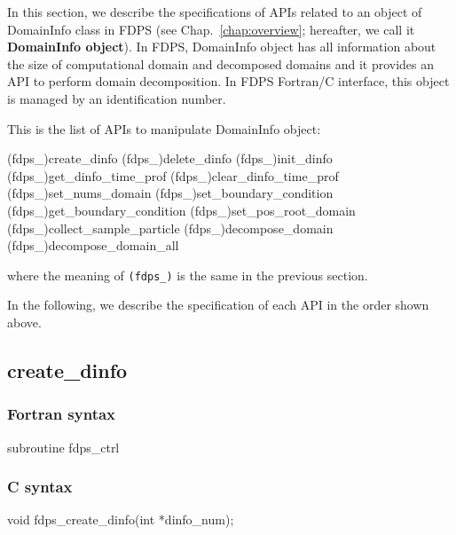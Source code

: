 In this section, we describe the specifications of APIs related to an object of DomainInfo class in FDPS (see Chap.~\ref{chap:overview}; hereafter, we call it \textbf{DomainInfo object}). In FDPS, DomainInfo object has all information about the size of computational domain and decomposed domains and it provides an API to perform domain decomposition. In FDPS Fortran/C interface, this object is managed by an identification number.

This is the list of APIs to manipulate DomainInfo object:
\begin{screen}
\begin{spverbatim}
(fdps_)create_dinfo
(fdps_)delete_dinfo
(fdps_)init_dinfo
(fdps_)get_dinfo_time_prof
(fdps_)clear_dinfo_time_prof
(fdps_)set_nums_domain
(fdps_)set_boundary_condition
(fdps_)get_boundary_condition
(fdps_)set_pos_root_domain
(fdps_)collect_sample_particle
(fdps_)decompose_domain
(fdps_)decompose_domain_all
\end{spverbatim}  
\end{screen}
where the meaning of \texttt{(fdps\_)} is the same in the previous section.

In the following, we describe the specification of each API in the order shown above.
\clearpage

\subsection{create\_dinfo}
\subsubsection*{Fortran syntax}
\begin{screen}
\begin{spverbatim}
subroutine fdps_ctrl%
\end{spverbatim}
\end{screen}

\subsubsection*{C syntax}
\begin{screen}
\begin{spverbatim}
void fdps_create_dinfo(int *dinfo_num);
\end{spverbatim}
\end{screen}


